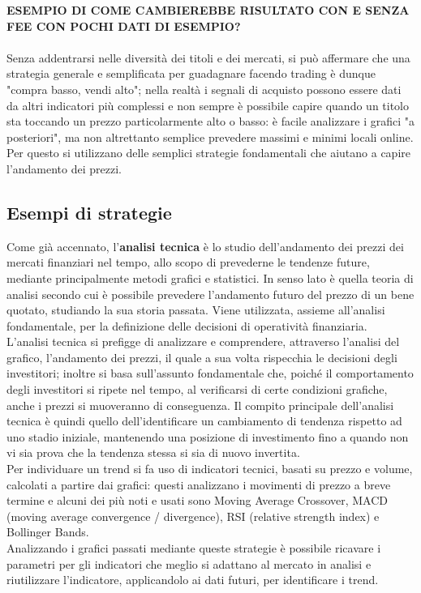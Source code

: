 \documentclass{article}
\numberwithin{equation}{section}
\begin{document}
		
		
		
		
		
		
		
		\textbf{ESEMPIO DI COME CAMBIEREBBE RISULTATO CON E SENZA FEE CON POCHI DATI DI ESEMPIO?}
		\\~\\
		
		
		
		
		
		
		
		
		
		
		Senza addentrarsi nelle diversità dei titoli e dei mercati, si può affermare che una strategia generale e semplificata per guadagnare facendo trading è dunque "compra basso, vendi alto"; nella realtà i segnali di acquisto possono essere dati da altri indicatori più complessi e non sempre è possibile capire quando un titolo sta toccando un prezzo particolarmente alto o basso: è facile analizzare i grafici "a posteriori", ma non altrettanto semplice prevedere massimi e minimi locali online. Per questo si utilizzano delle semplici strategie fondamentali che aiutano a capire l'andamento dei prezzi.
		
		
	\subsection{Esempi di strategie}
		Come già accennato, l'\textbf{analisi tecnica} è lo studio dell'andamento dei prezzi dei mercati finanziari nel tempo, allo scopo di prevederne le tendenze future, mediante principalmente metodi grafici e statistici. In senso lato è quella teoria di analisi secondo cui è possibile prevedere l'andamento futuro del prezzo di un bene quotato, studiando la sua storia passata. Viene utilizzata, assieme all'analisi fondamentale, per la definizione delle decisioni di operatività finanziaria.\\
		L'analisi tecnica si prefigge di analizzare e comprendere, attraverso l'analisi del grafico, l'andamento dei prezzi, il quale a sua volta rispecchia le decisioni degli investitori; inoltre si basa sull'assunto fondamentale che, poiché il comportamento degli investitori si ripete nel tempo, al verificarsi di certe condizioni grafiche, anche i prezzi si muoveranno di conseguenza. Il compito principale dell'analisi tecnica è quindi quello dell'identificare un cambiamento di tendenza rispetto ad uno stadio iniziale, mantenendo una posizione di investimento fino a quando non vi sia prova che la tendenza stessa si sia di nuovo invertita.\\
		Per individuare un trend si fa uso di indicatori tecnici, basati su prezzo e volume, calcolati a partire dai grafici: questi analizzano i movimenti di prezzo a breve termine e alcuni dei più noti e usati sono Moving Average Crossover, MACD (moving average convergence / divergence), RSI (relative strength index) e Bollinger Bands.\\
		Analizzando i grafici passati mediante queste strategie è possibile ricavare i parametri per gli indicatori che meglio si adattano al mercato in analisi e riutilizzare l'indicatore, applicandolo ai dati futuri, per identificare i trend.\\~\\
		
\end{document}
